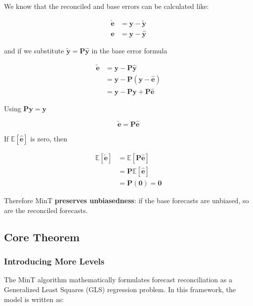 \documentclass[sn-basic,Numbered,iicol]{sn-jnl}
\theoremstyle{thmstyleone}%
\theoremstyle{thmstyletwo}%
\theoremstyle{thmstylethree}%
\begin{document}
We know that the reconciled and base errors can be calculated like:

\begin{align}
\tilde{\mathbf{e}} &= \mathbf{y} - \tilde{\mathbf{y}} \\
\hat{\mathbf{e}} &= \mathbf{y} - \hat{\mathbf{y}}
\end{align}

and if we substitute $\tilde{\mathbf{y}} = \mathbf{P}\hat{\mathbf{y}}$ in the base error formula

\begin{align}
\tilde{\mathbf{e}} &= \mathbf{y} - \mathbf{P}\hat{\mathbf{y}} \nonumber \\
&= \mathbf{y} - \mathbf{P}(\mathbf{y} - \hat{\mathbf{e}}) \nonumber \\
&= \mathbf{y} - \mathbf{P}\mathbf{y} + \mathbf{P}\hat{\mathbf{e}}
\end{align}

Using $\mathbf{P}\mathbf{y} = \mathbf{y}$

\begin{equation}
\tilde{\mathbf{e}} = \mathbf{P}\hat{\mathbf{e}}
\end{equation}

If $\mathbb{E}[\hat{\mathbf{e}}]$ is zero, then

\begin{align}
\mathbb{E}[\tilde{\mathbf{e}}] &= \mathbb{E}[\mathbf{P}\hat{\mathbf{e}}] \nonumber \\
&= \mathbf{P}\mathbb{E}[\hat{\mathbf{e}}] \nonumber \\
&= \mathbf{P}(\mathbf{0}) = \mathbf{0}
\end{align}

Therefore MinT \textbf{preserves unbiasedness}: if the base forecasts are unbiased, so are the reconciled forecasts.

\subsection{Core Theorem}\label{subsec:core}

\subsubsection{Introducing More Levels}\label{subsubsec:morelevels}

The MinT algorithm mathematically formulates forecast reconciliation as a Generalized Least Squares (GLS) regression problem. In this framework, the model is written as:
\end{document}
